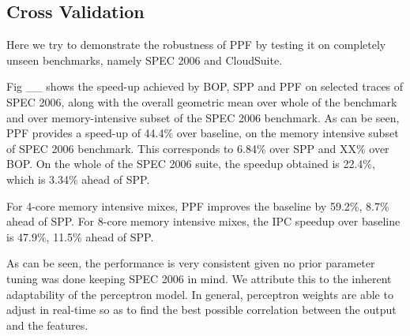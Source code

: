 \subsection{Cross Validation}
\label{Results-CrossVal}
Here we try to demonstrate the robustness of PPF by testing it on
completely unseen benchmarks, namely SPEC 2006 and CloudSuite.

Fig \_\_ shows the speed-up achieved by BOP, SPP and PPF on
selected traces of SPEC 2006, along with the overall geometric mean
over whole of the benchmark and over memory-intensive subset of the
SPEC 2006 benchmark.  As can be seen, PPF provides a speed-up of
44.4\% over baseline, on the memory intensive subset of SPEC 2006
benchmark.  This corresponds to 6.84\% over SPP and XX\% over BOP.  On
the whole of the SPEC 2006 suite, the speedup obtained is 22.4\%,
which is 3.34\% ahead of SPP.

For 4-core memory intensive mixes, PPF improves the baseline by 59.2\%, 
8.7\% ahead of SPP. For 8-core memory intensive mixes, the IPC speedup 
over baseline is 47.9\%, 11.5\% ahead of SPP. 

As can be seen, the performance is very consistent given no prior
parameter tuning was done keeping SPEC 2006 in mind.  We attribute
this to the inherent adaptability of the perceptron model.  In
general, perceptron weights are able to adjust in real-time so as to
find the best possible correlation between the output and the
features.
